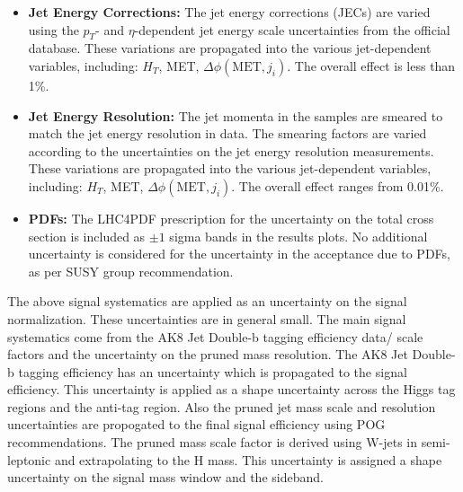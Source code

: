 \begin{itemize}
\item {\bf Jet Energy Corrections:} The jet energy corrections (JECs) are varied using the $p_{T}$-
and $\eta$-dependent jet energy scale uncertainties from the official database.
These variations are propagated into the various jet-dependent variables, including: $H_{T}$, MET, $\Delta\phi(\textrm{MET},j_{i})$.
The overall effect is less than 1\%.
\item {\bf Jet Energy Resolution:} The jet momenta in the  samples are smeared to match the jet energy resolution in data. The smearing factors are varied according to the uncertainties on the jet energy resolution measurements.
These variations are propagated into the various jet-dependent variables, including: $H_{T}$, MET, $\Delta\phi(\textrm{MET},j_{i})$.
The overall effect ranges from 0.01\%.
\item {\bf PDFs:} The LHC4PDF prescription for the uncertainty on the total cross section is included as $\pm 1$ sigma bands in the results plots. No
additional uncertainty is considered for the uncertainty in the acceptance due to PDFs, as per SUSY group recommendation.
\end{itemize}
The above signal systematics are applied as an uncertainty on the signal normalization. These uncertainties are in general small. The main signal systematics 
come from the AK8 Jet Double-b tagging efficiency data/ scale factors and the uncertainty on the pruned mass resolution.
The AK8 Jet Double-b tagging efficiency has an uncertainty which is propagated to the signal efficiency. This uncertainty is applied 
as a shape uncertainty across the Higgs tag regions and the anti-tag region. Also the pruned jet mass scale and resolution uncertainties are 
propogated to the final signal efficiency using POG recommendations. The pruned mass scale factor is derived using W-jets in semi-leptonic \ttbar and extrapolating to the H mass. This uncertainty is assigned a shape uncertainty on the signal mass window and the sideband. \\
